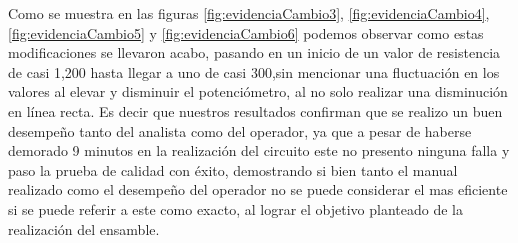     Como se muestra en las figuras \ref{fig:evidenciaCambio3}, \ref{fig:evidenciaCambio4}, \ref{fig:evidenciaCambio5} y \ref{fig:evidenciaCambio6} podemos observar como estas modificaciones se llevaron acabo, pasando en un inicio de un valor de resistencia de casi 1,200 hasta llegar a uno de casi 300,sin mencionar una fluctuación en los valores al elevar y disminuir el potenciómetro, al no solo realizar una disminución en línea recta. Es decir que nuestros resultados confirman que se realizo un buen desempeño tanto del analista como del operador, ya que a pesar de haberse demorado 9 minutos en la realización del circuito este no presento ninguna falla y paso la prueba de calidad con éxito, demostrando  si bien  tanto el manual realizado como el desempeño del operador no se puede considerar el mas eficiente si se puede referir a este como exacto, al lograr el objetivo planteado de la realización del ensamble.
    
    
    
    
    
    
